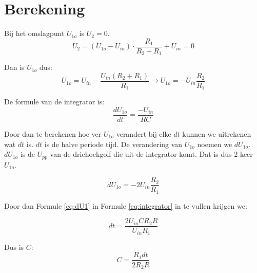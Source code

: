 \section{Berekening}

Bij het omslagpunt $U_{1o}$ is $U_2 = 0$.
\begin{equation}
    U_2=(U_{1o}-U_{in})\cdot\frac{R_1}{R_2+R_1}+U_{in} = 0
\end{equation}

\noindent
Dan is $U_{1o}$ dus:
\begin{equation}
    U_{1o}=U_{in}-\frac{U_{in}(R_2+R_1)}{R_1}\rightarrow U_{1o} = -U_{in}\frac{R_2}{R_1}
\end{equation}

\noindent
De formule van de integrator is:
\begin{equation} \label{eq:integrator}
    \frac{dU_{1o}}{dt}=\frac{-U_{in}}{RC}
\end{equation}

\noindent
Door dan te berekenen hoe ver $U_{1o}$ verandert bij elke $dt$ kunnen we uitrekenen wat $dt$ is. $dt$ is de halve periode tijd.
De verandering van $U_{1o}$ noemen we $dU_{1o}$. $dU_{1o}$ is de $U_{pp}$ van de driehoekgolf die uit de integrator komt.
Dat is dus 2 keer $U_{1o}$.


\begin{equation} \label{eq:dU1}
    dU_{1o}=-2U_{in}\frac{R_2}{R_1}
\end{equation}

\noindent
Door dan Formule \ref{eq:dU1} in Formule \ref{eq:integrator} in te vullen krijgen we:

\begin{equation}
    dt = \frac{2U_{in}CR_2R}{U_{in}R_1}
\end{equation}

\noindent
Dus is $C$:
\begin{equation}
    C=\frac{R_1dt}{2R_2R}
\end{equation}